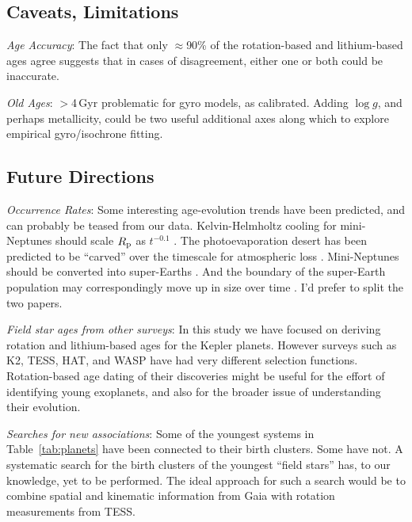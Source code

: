 \documentclass[11pt,twocolumn,tighten]{aastex63}
\begin{document}
\subsection{Caveats, Limitations}

{\it Age Accuracy}: The fact that only $\approx$90\% of the
rotation-based and lithium-based ages agree suggests that in cases of
disagreement, either one or both could be inaccurate.

{\it Old Ages}: $>$4\,Gyr problematic for gyro models, as calibrated.  Adding
$\log g$, and perhaps metallicity, could be two useful additional axes
along which to explore empirical gyro/isochrone fitting.

\subsection{Future Directions}
{\it Occurrence Rates}: Some interesting
age-evolution trends have been predicted, and can probably be teased
from our data.  
Kelvin-Helmholtz cooling for mini-Neptunes should scale $R_{\rm p}$ as
$t^{-0.1}$ \citep{Gupta_2019}.
The photoevaporation desert has been predicted to be ``carved'' over the timescale
for atmospheric loss \citep{Owen_Lai_2018}.
Mini-Neptunes should be converted into super-Earths \citep{Rogers_2021}.
And the boundary of the super-Earth population may correspondingly move up in size over
time \citep{David_2021}.
I'd prefer to split the two papers.

{\it Field star ages from other surveys}:
In this study we have focused on deriving rotation and lithium-based ages for the Kepler
planets.  However surveys such as K2, TESS, HAT, and WASP have had very different selection functions.
Rotation-based age dating of their discoveries might be useful for the effort
of identifying young exoplanets, and also for the broader issue of understanding
their evolution.

{\it Searches for new associations}:
Some of the youngest systems in Table~\ref{tab:planets} have been
connected to their birth clusters.
Some have not.
A systematic search for the birth clusters of the youngest ``field stars'' has, to our knowledge,
yet to be performed.
The ideal approach for such a search would be to combine spatial and kinematic information
from Gaia with rotation measurements from TESS.


%   
%   
%   
%   
%   
\end{document}
